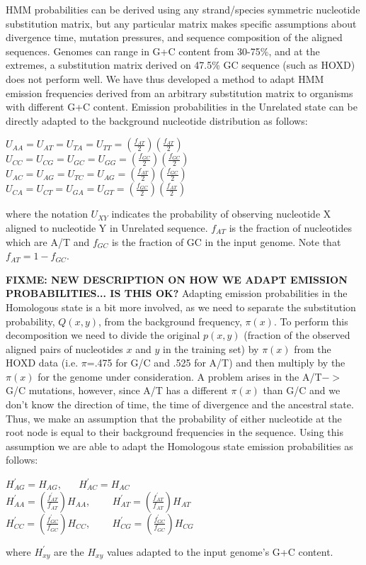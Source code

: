 \documentclass{llncs}
\begin{document}
HMM probabilities can be derived using any strand/species symmetric nucleotide substitution matrix,
but any particular matrix makes specific assumptions about divergence time, mutation pressures,
and sequence composition of the aligned sequences.
Genomes can range in G+C content from 30-75\%, and at the extremes,
a substitution matrix derived on 47.5\% GC sequence (such as HOXD) does not
perform well.  We have thus developed a method to adapt HMM emission
frequencies derived from an arbitrary substitution matrix
to organisms with different G+C content.  Emission
probabilities in the Unrelated state can be directly adapted to the
background nucleotide distribution as follows:
\begin{center}
$U_{AA}=U_{AT}=U_{TA}=U_{TT}=(\frac{f_{AT}}{2})(\frac{f_{AT}}{2})$
$U_{CC}=U_{CG}=U_{GC}=U_{GG}=(\frac{f_{GC}}{2})(\frac{f_{GC}}{2})$
$U_{AC}=U_{AG}=U_{TC}=U_{AG}=(\frac{f_{AT}}{2})(\frac{f_{GC}}{2})$
$U_{CA}=U_{CT}=U_{GA}=U_{GT}=(\frac{f_{GC}}{2})(\frac{f_{AT}}{2})$
\end{center}
where the notation $U_{XY}$ indicates the probability of observing nucleotide X aligned to
nucleotide Y in Unrelated sequence.  $f_{AT}$ is the fraction of nucleotides which are A/T and
$f_{GC}$ is the fraction of GC in the input genome.  Note that $f_{AT}=1-f_{GC}$.


\textbf{FIXME: NEW DESCRIPTION ON HOW WE ADAPT EMISSION PROBABILITIES... IS THIS OK?}
Adapting emission probabilities in the Homologous state is a bit more
involved, as we need to separate the substitution probability,
$Q(x,y)$, from the background frequency, $\pi(x)$.  To perform this
decomposition we need to divide the original $p(x,y)$ (fraction of the
observed aligned pairs of nucleotides $x$ and $y$ in the training set)
by $\pi(x)$ from the HOXD data (i.e. $\pi$=.475 for G/C and .525 for
A/T) and then multiply by the $\pi(x)$ for the genome under
consideration. A problem arises in the A/T$->$G/C mutations, however,
since A/T has a different $\pi(x)$ than G/C and we don't know the
direction of time, the time of divergence and the ancestral
state. Thus, we make an assumption that the probability of either
nucleotide at the root node is equal to their background frequencies
in the sequence. Using this assumption we are able to adapt the
Homologous state emission probabilities as follows:
\begin{center}
$H^{'}_{AG}=H_{AG}$, \ \ \ $H^{'}_{AC}=H_{AC}$ \\
$H^{'}_{AA}=(\frac{f^{'}_{AT}}{f_{AT}})H_{AA}$, \ \ \ \
$H^{'}_{AT}=(\frac{f^{'}_{AT}}{f_{AT}})H_{AT}$\\
$H^{'}_{CC}=(\frac{f^{'}_{GC}}{f_{GC}})H_{CC}$, \ \ \ \
$H^{'}_{CG}=(\frac{f^{'}_{GC}}{f_{GC}})H_{CG}$\\
\end{center}
where $H^{'}_{xy}$ are the $H_{xy}$ values adapted to the input genome's G+C content.
\end{document}
